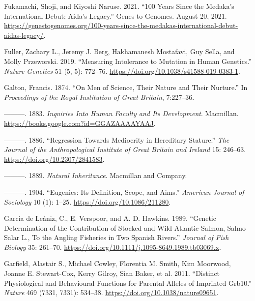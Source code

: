 \documentclass[
]{book}
\newlength{\cslhangindent}
\newlength{\cslentryspacingunit} %
\newenvironment{CSLReferences}[2] %
 {%
  \setlength{\parindent}{0pt}
  \ifodd #1
  \let\oldpar\par
  \def\par{\hangindent=\cslhangindent\oldpar}
  \fi
  \setlength{\parskip}{#2\cslentryspacingunit}
 }%
 {}
\begin{document}
\begin{CSLReferences}{1}{0}
\leavevmode{}%
Fukamachi, Shoji, and Kiyoshi Naruse. 2021. {``100 Years Since the Medaka's International Debut: {Aida}'s Legacy.''} {Genes to Genomes}. August 20, 2021. \url{https://genestogenomes.org/100-years-since-the-medakas-international-debut-aidas-legacy/}.

\leavevmode{}%
Fuller, Zachary L., Jeremy J. Berg, Hakhamanesh Mostafavi, Guy Sella, and Molly Przeworski. 2019. {``Measuring Intolerance to Mutation in Human Genetics.''} \emph{Nature Genetics} 51 (5, 5): 772--76. \url{https://doi.org/10.1038/s41588-019-0383-1}.

\leavevmode{}%
Galton, Francis. 1874. {``On {Men} of {Science}, Their {Nature} and Their {Nurture}.''} In \emph{Proceedings of the {Royal Institution} of {Great Britain}}, 7:227--36.

\leavevmode{}%
---------. 1883. \emph{Inquiries {Into Human Faculty} and {Its Development}}. {Macmillan}. \url{https://books.google.com?id=GGAZAAAAYAAJ}.

\leavevmode{}%
---------. 1886. {``Regression {Towards Mediocrity} in {Hereditary Stature}.''} \emph{The Journal of the Anthropological Institute of Great Britain and Ireland} 15: 246--63. \url{https://doi.org/10.2307/2841583}.

\leavevmode{}%
---------. 1889. \emph{Natural Inheritance}. {Macmillan and Company}.

\leavevmode{}%
---------. 1904. {``Eugenics: {Its Definition}, {Scope}, and {Aims}.''} \emph{American Journal of Sociology} 10 (1): 1--25. \url{https://doi.org/10.1086/211280}.

\leavevmode{}%
Garcia de Leániz, C., E. Verspoor, and A. D. Hawkins. 1989. {``Genetic Determination of the Contribution of Stocked and Wild {Atlantic} Salmon, {Salmo} Salar {L}., To the Angling Fisheries in Two {Spanish} Rivers.''} \emph{Journal of Fish Biology} 35: 261--70. \url{https://doi.org/10.1111/j.1095-8649.1989.tb03069.x}.

\leavevmode{}%
Garfield, Alastair S., Michael Cowley, Florentia M. Smith, Kim Moorwood, Joanne E. Stewart-Cox, Kerry Gilroy, Sian Baker, et al. 2011. {``Distinct Physiological and Behavioural Functions for Parental Alleles of Imprinted {Grb10}.''} \emph{Nature} 469 (7331, 7331): 534--38. \url{https://doi.org/10.1038/nature09651}.


\end{CSLReferences}
\end{document}
